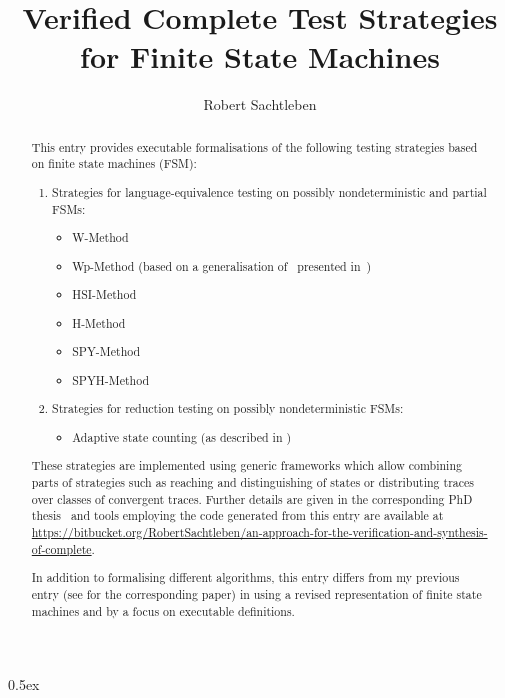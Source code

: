 \documentclass[11pt,a4paper]{article}
\begin{document}
\title{Verified Complete Test Strategies for Finite State Machines}
\author{Robert Sachtleben}
\maketitle

\begin{abstract}
	This entry provides executable formalisations of the following testing strategies based on finite state machines (FSM):
\begin{enumerate}
	\item Strategies for language-equivalence testing on possibly nondeterministic and partial FSMs:
	\begin{itemize}
		\item W-Method \cite{chow:wmethod} 
		\item Wp-Method (based on a generalisation of~\cite{luo_test_1994} presented in~\cite{PeleskaHuangLectureNotesMBT})
		\item HSI-Method \cite{luo_selecting_1995}
		\item H-Method \cite{DBLP:conf/forte/DorofeevaEY05}
		\item SPY-Method \cite{simao_reducing_2012}
		\item SPYH-Method \cite{Soucha2018}
	\end{itemize}
	\item Strategies for reduction testing on possibly nondeterministic FSMs:
	\begin{itemize}
		\item Adaptive state counting (as described in \cite{DBLP:conf/hase/PetrenkoY14})
	\end{itemize}
\end{enumerate}
	These strategies are implemented using generic frameworks which allow combining parts of strategies such as reaching and distinguishing of states or distributing traces over classes of convergent traces. Further details are given in the corresponding PhD thesis~\cite{elib_6068} and tools employing the code generated from this entry are available at \url{https://bitbucket.org/RobertSachtleben/an-approach-for-the-verification-and-synthesis-of-complete}.
	
	In addition to formalising different algorithms, this entry differs from my previous entry \cite{Adaptive_State_Counting-AFP} (see \cite{Sachtleben2019} for the corresponding paper) in using a revised representation of finite state machines and by a focus on executable definitions. 
    
\end{abstract}

\tableofcontents

\parindent 0pt\parskip 0.5ex




\end{document}

